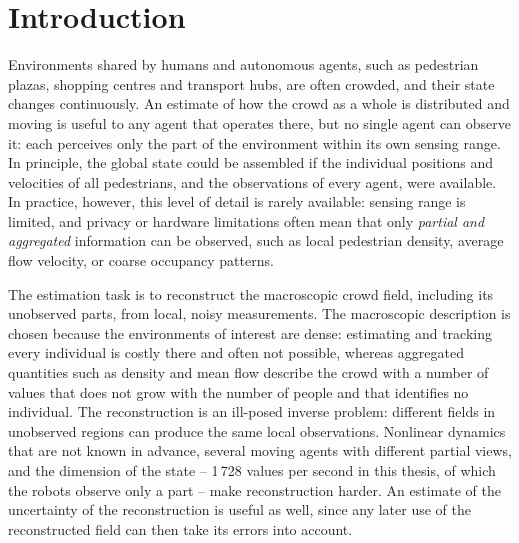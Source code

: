 \documentclass[english, 12pt, a4paper, elec, utf8, a-2b, online]{aaltothesis}
\begin{document}
\cleardoublepage

\section{Introduction}
\label{sec:intro}


Environments shared by humans and autonomous agents, such as pedestrian
plazas, shopping centres and transport hubs, are often crowded, and their state
changes continuously. An estimate of how the crowd as a whole is distributed
and moving is useful to any agent that operates there, but no single agent can
observe it: each perceives only the part of the environment within its own
sensing range. In principle, the global state could be assembled if the
individual positions and velocities of all pedestrians, and the observations of
every agent, were available. In practice, however, this level of detail is
rarely available: sensing range is limited, and privacy or hardware
limitations often mean that only \emph{partial and aggregated}
information can be observed, such as local pedestrian density,
average flow velocity, or coarse occupancy patterns.

The estimation task is to reconstruct the macroscopic crowd field, including
its unobserved parts, from local, noisy measurements. The macroscopic
description is chosen because the environments of interest are dense:
estimating and tracking every individual is costly there and often not
possible, whereas aggregated quantities such as density and mean flow describe
the crowd with a number of values that does not grow with the number of people
and that identifies no individual. The reconstruction is an ill-posed inverse
problem: different fields in unobserved regions can produce the same local
observations. Nonlinear dynamics that are not known in advance, several moving
agents with different partial views, and the dimension of the state --
1\,728 values per second in this thesis, of which the robots observe only a
part -- make reconstruction harder. An estimate of the uncertainty of the
reconstruction is useful as well, since any later use of the reconstructed
field can then take its errors into account.

\end{document}
